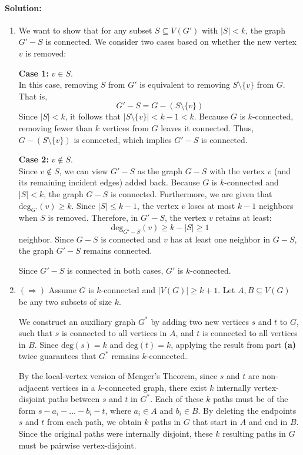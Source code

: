 \documentclass[a4paper,12pt]{article}
\renewcommand{\deg}{\textrm{deg}}
\begin{document}
\paragraph{Solution:}
\begin{enumerate}
    \item[\textbf{(a)}]
    We want to show that for any subset $S \subseteq V(G')$ with $|S| < k$, the graph $G' - S$ is connected. We consider two cases based on whether the new vertex $v$ is removed:
    
    \medskip
    \noindent\textbf{Case 1:} $v \in S$. \\
    In this case, removing $S$ from $G'$ is equivalent to removing $S \setminus \{v\}$ from $G$. That is,
    \[
    G' - S = G - (S \setminus \{v\})
    \]
    Since $|S| < k$, it follows that $|S \setminus \{v\}| < k - 1 < k$. Because $G$ is $k$-connected, removing fewer than $k$ vertices from $G$ leaves it connected. Thus, $G - (S \setminus \{v\})$ is connected, which implies $G' - S$ is connected.
    
    \medskip
    \noindent\textbf{Case 2:} $v \notin S$. \\
    Since $v \notin S$, we can view $G' - S$ as the graph $G - S$ with the vertex $v$ (and its remaining incident edges) added back. 
    Because $G$ is $k$-connected and $|S| < k$, the graph $G - S$ is connected. 
    Furthermore, we are given that $\deg_{G'}(v) \ge k$. Since $|S| \le k - 1$, the vertex $v$ loses at most $k - 1$ neighbors when $S$ is removed. Therefore, in $G' - S$, the vertex $v$ retains at least:
    \[
    \deg_{G'-S}(v) \ge k - |S| \ge 1
    \]
    neighbor. Since $G - S$ is connected and $v$ has at least one neighbor in $G - S$, the graph $G' - S$ remains connected.
    
    \medskip
    Since $G' - S$ is connected in both cases, $G'$ is $k$-connected.

    \item[\textbf{(b)}]

    $(\Rightarrow)$ Assume $G$ is $k$-connected and $|V(G)| \ge k+1$. Let $A, B \subseteq V(G)$ be any two subsets of size $k$. 
    
    We construct an auxiliary graph $G^*$ by adding two new vertices $s$ and $t$ to $G$, such that $s$ is connected to all vertices in $A$, and $t$ is connected to all vertices in $B$. 
    Since $\deg(s) = k$ and $\deg(t) = k$, applying the result from part \textbf{(a)} twice guarantees that $G^*$ remains $k$-connected.
    
    By the local-vertex version of Menger's Theorem, since $s$ and $t$ are non-adjacent vertices in a $k$-connected graph, there exist $k$ internally vertex-disjoint paths between $s$ and $t$ in $G^*$. 
    Each of these $k$ paths must be of the form $s - a_i - \dots - b_i - t$, where $a_i \in A$ and $b_i \in B$. By deleting the endpoints $s$ and $t$ from each path, we obtain $k$ paths in $G$ that start in $A$ and end in $B$. Since the original paths were internally disjoint, these $k$ resulting paths in $G$ must be pairwise vertex-disjoint.
    

\end{enumerate}
\end{document}
